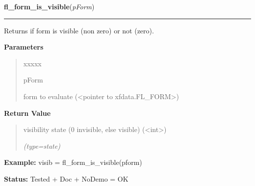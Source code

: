     \vspace{0.5ex}

\hspace{.8\funcindent}\begin{boxedminipage}{\funcwidth}

    \raggedright \textbf{fl\_form\_is\_visible}(\textit{pForm})

    \vspace{-1.5ex}

    \rule{\textwidth}{0.5\fboxrule}
\setlength{\parskip}{2ex}
    Returns if form is visible (non zero) or not (zero).

\setlength{\parskip}{1ex}
      \textbf{Parameters}
      \vspace{-1ex}

      \begin{quote}
        \begin{Ventry}{xxxxx}

          \item[pForm]

          form to evaluate ({\textless}pointer to 
          xfdata.FL\_FORM{\textgreater})

        \end{Ventry}

      \end{quote}

      \textbf{Return Value}
    \vspace{-1ex}

      \begin{quote}
      visibility state (0 invisible, else visible) 
      ({\textless}int{\textgreater})

      {\it (type=state)}

      \end{quote}

\textbf{Example:} visib = fl\_form\_is\_visible(pform)



\textbf{Status:} Tested + Doc + NoDemo = OK



    \end{boxedminipage}

    \label{xformslib:library:fl_form_is_iconified}

    \vspace{0.5ex}

